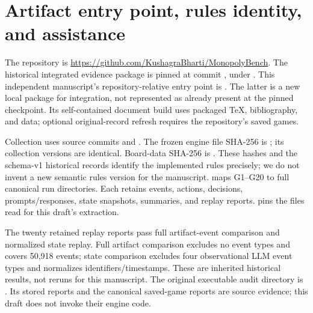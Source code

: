 \section{Artifact entry point, rules identity, and assistance}
\label{app:release}

The repository is \url{https://github.com/KushagraBharti/MonopolyBench}. The historical integrated evidence package is pinned at commit , under . This independent manuscript's repository-relative entry point is . The latter is a new local package for integration, not represented as already present at the pinned checkpoint. Its self-contained document build uses packaged TeX, bibliography, and data; optional original-record refresh requires the repository's saved games.

Collection uses source commits  and . The frozen engine file SHA-256 is ; its collection versions are identical. Board-data SHA-256 is . These hashes and the schema-v1 historical records identify the implemented rules precisely; we do not invent a new semantic rules version for the manuscript.  maps G1--G20 to full canonical run directories. Each retains events, actions, decisions, prompts/responses, state snapshots, summaries, and replay reports.  pins the files read for this draft's extraction.



The twenty retained replay reports pass full artifact-event comparison and normalized state replay. Full artifact comparison excludes no event types and covers 50,918 events; state comparison excludes four observational LLM event types and normalizes identifiers/timestamps. These are inherited historical results, not reruns for this manuscript. The original executable audit directory is . Its stored reports and the canonical saved-game reports are source evidence; this draft does not invoke their engine code.

